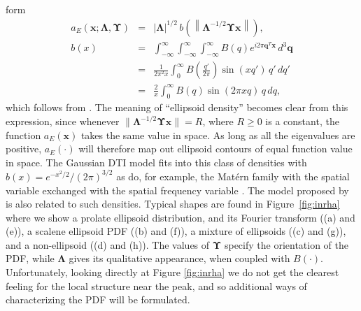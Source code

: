 \documentclass[dvips,aoas,preprint]{imsart}
\numberwithin{equation}{section}
\theoremstyle{plain}
\newcommand{\q}{\mathbf{q}}
\newcommand{\x}{\mathbf{x}}
\newcommand{\bs}[1]{\boldsymbol{#1}}
\begin{document}
form
\begin{eqnarray}\label{ellipsoid2}
  a_E(\x;\bs{\Lambda},\bs{\Upsilon}) &=& |\bs{\Lambda}|^{1/2} \,
  b\left(\left\|\bs{\Lambda}^{-1/2}\bs{\Upsilon}\x\right\|\right),\\
  b(x) &=& \int_{-\infty}^{\infty} \int_{-\infty}^{\infty}
  \int_{-\infty}^{\infty} B(q) e^{i2\pi\q^T\x} \, d^3\q\\
  &=& \frac{1}{2\pi^2 x}\int_0^{\infty}
  B\left(\frac{q'}{2\pi}\right)\sin(xq')\,q'\,dq'\\
  &=& \frac{2}{x}\int_0^{\infty}B(q)\sin(2\pi xq) \,q\,dq,
  \nonumber
\end{eqnarray}
which follows from \citet[p.~1112]{grad}.  The meaning of ``ellipsoid
density'' becomes clear from this expression, since whenever
$\|\bs{\Lambda}^{-1/2}\bs{\Upsilon}\x\|=R$, where $R\ge 0$ is a
constant, the function $a_E(\x)$ takes the same value in space.  As
long as all the eigenvalues are positive, $ a_E(\cdot)$ will therefore
map out ellipsoid contours of equal function value in space.  The
Gaussian DTI model fits into this class of densities with
$b(x)=e^{-x^2/2}/(2\pi)^{3/2}$ as do, for example, the Mat\'ern family
with the spatial variable exchanged with the spatial frequency
variable \citep{Matern}.  The model proposed by \citet{Kaden2007} is
also related to such densities.  Typical shapes are found in
Figure~\ref{fig:inrha} where we show a prolate ellipsoid distribution,
and its Fourier transform ((a) and (e)), a scalene ellipsoid PDF ((b)
and (f)), a mixture of ellipsoids ((c) and (g)), and a non-ellipsoid
((d) and (h)). The values of $\bm{\Upsilon}$ specify the orientation
of the PDF, while $\bm{\Lambda}$ gives its qualitative appearance,
when coupled with $B(\cdot)$. Unfortunately, looking directly at
Figure \ref{fig:inrha} we do not get the clearest feeling for the
local structure near the peak, and so additional ways of
characterizing the PDF will be formulated.
\end{document}
